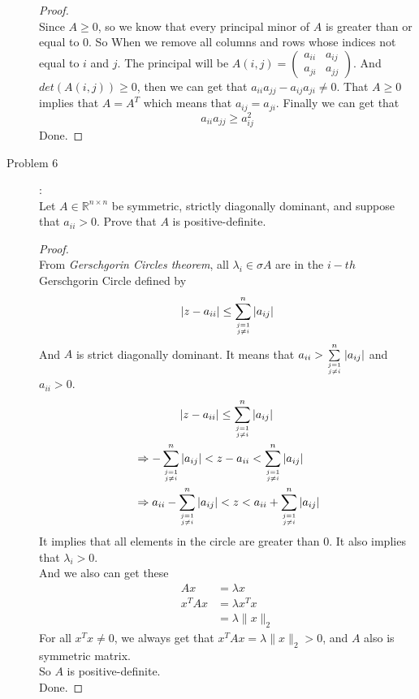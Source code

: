 \documentclass[a4paper]{article}
\begin{document}
\begin{description}
  \begin{proof}\ \\
    Since $A\ge 0$, so we know that every principal minor of $A$ is greater than or equal to $0$. So When we remove all columns and rows whose indices not equal to $i$ and $j$. The principal will be
    $A(i,j)=\begin{pmatrix}
      a_{ii} & a_{ij}\\
      a_{ji} & a_{jj}
    \end{pmatrix}$. And $det(A(i,j))\ge 0$, then we can get that $a_{ii}a_{jj}-a_{ij}a_{ji}\ne 0$. That $A\ge 0$ implies that $A=A^{T}$ which means that $a_{ij}=a_{ji}$. Finally we can get that $$a_{ii}a_{jj}\ge a_{ij}^{2}$$
    Done.
  \end{proof}

  \item[Problem 6]:\\
    Let $A\in \mathbb{R}^{n\times n}$ be symmetric, strictly diagonally dominant, and suppose that $a_{ii}>0$. Prove that $A$ is positive-definite.

  \begin{proof}\ \\
      From \textit{Gerschgorin Circles theorem}, all $\lambda_{i} \in \sigma{A}$ are in the $i-th$ Gerschgorin Circle defined by $$|z-a_{ii}|\le \sum\limits_{j=1\atop j\ne i}^{n}|a_{ij}|$$
      And $A$ is strict diagonally dominant. It means that $a_{ii}> \sum\limits_{j=1\atop j\ne i}^{n}|a_{ij}|$ and $a_{ii}>0$.
      \begin{align*}
      & \qquad\qquad  |z-a_{ii}|\le \sum\limits_{j=1\atop j\ne i}^{n}|a_{ij}|\\
      &\Rightarrow  -\sum\limits_{j=1\atop j\ne i}^{n}|a_{ij}|<z-a_{ii}<\sum\limits_{j=1\atop j\ne i}^{n}|a_{ij}|\\
      &\Rightarrow  a_{ii}-\sum\limits_{j=1\atop j\ne i}^{n}|a_{ij}|<z<a_{ii}+\sum\limits_{j=1\atop j\ne i}^{n}|a_{ij}|
      \end{align*}
      It implies that all elements in the circle are greater than $0$. It also implies that $\lambda_{i}>0$. \\
      And we also can get these
      \begin{align*}
        Ax&=\lambda x\\
        x^{T}Ax&=\lambda x^{T}x\\
        &=\lambda \|x\|_{2}
      \end{align*}
      For all $x^{T}x\ne 0$, we always get that $x^{T}Ax=\lambda \|x\|_{2}>0$, and $A$ also is symmetric matrix.\\
       So $A$ is positive-definite.\\
       Done.
  \end{proof}

\end{description}
\end{document}

